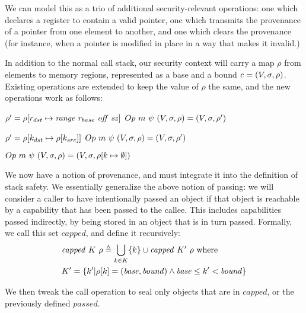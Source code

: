 \documentclass[10pt,conference]{ieeetran}%
\theoremstyle{definition}
\begin{document}
We can model this as a trio of additional security-relevant operations: one which
declares a register to contain a valid pointer, one which transmits the provenance
of a pointer from one element to another, and one which clears the provenance
(for instance, when a pointer is modified in place in a way that makes it invalid.)

In addition to the normal call stack, our security context will carry a map \(\rho\) from
elements to memory regions, represented as a base and a bound \(\mathit{c} = (V, \sigma, \rho)\).
Existing operations are extended to keep the value of \(\rho\) the same, and the new operations
work as follows:

           {\(\rho' = \rho[r_{dst} \mapsto \mathit{range} ~ r_{base} ~ \mathit{off} ~ \mathit{sz}]\)}
           {\(Op ~ m ~ \psi ~ (V,\sigma,\rho) = (V,\sigma,\rho')\)}

           {\(\rho' = \rho[k_{dst} \mapsto \rho[k_{src}]]\)}
           {\(Op ~ m ~ \psi ~ (V,\sigma,\rho) = (V,\sigma,\rho')\)}

         {\(Op ~ m ~ \psi ~ (V,\sigma,\rho) = (V,\sigma,\rho[k \mapsto \emptyset])\)}

We now have a notion of provenance, and must integrate it into the definition of
stack safety. We essentially generalize the above notion of passing: we will consider
a caller to have intentionally passed an object if that object is reachable by
a capability that has been passed to the callee. This includes capabilities passed
indirectly, by being stored in an object that is in turn passed. Formally, we call
this set \(\mathit{capped}\), and define it recursively:
%
\[\begin{split}
& \mathit{capped} ~ K ~ \rho \triangleq \bigcup_{k \in K} \{k\} \cup \mathit{capped} ~ K' ~ \rho \textnormal{ where} \\
& K' = \{k' |\rho[k] = (\mathit{base},\mathit{bound})
\land \mathit{base} \leq k' < \mathit{bound}\} \\
\end{split}\]

We then tweak the call operation to seal only objects that are in \(\mathit{capped}\), or
the previously defined \(\mathit{passed}\).
\end{document}
